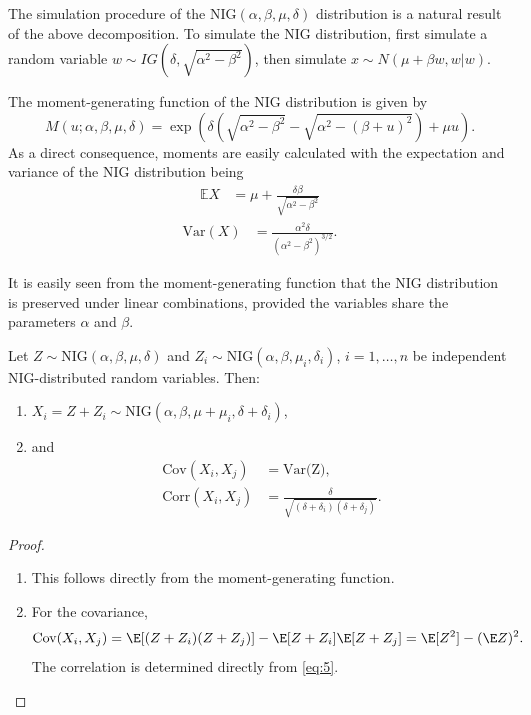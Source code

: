 \documentclass[11pt,a4paper,english]{article}
\begin{document}
The simulation procedure of the NIG$(\alpha, \beta, \mu, \delta)$
distribution is a natural result of the above decomposition.  
To simulate the NIG distribution, first simulate a random variable $w \sim IG(\delta, \sqrt{\alpha^2-\beta^2})$, 
then simulate $x \sim N(\mu+ \beta w, w|w)$. 

The moment-generating function of the NIG distribution is given by
\begin{equation*}
  M(u; \alpha, \beta, \mu, \delta) = \exp\left( \delta
    \left(\sqrt{\alpha^2-\beta^2} - \sqrt{\alpha^2 - (\beta +
        u)^2}\right) + \mu u\right). 
\end{equation*}
As a direct consequence, moments are easily calculated with the
expectation and variance of the NIG distribution being
\begin{align*}
  \mathbb E X &= \mu +
                \frac{\delta \beta}{\sqrt{\alpha^2-\beta^2}}
  \end{align*}
\begin{align} \label{eq:5}
  \text{Var}(X) &= \frac{\alpha^2\delta}{(\alpha^2-\beta^2)^{3/2}}.
\end{align}

It is easily seen from the moment-generating function that the NIG distribution is preserved under linear combinations, provided
the variables share the parameters $\alpha$ and $\beta$. 
\begin{prop}
  \label{prop:NIG}
  Let $Z\sim \text{NIG}(\alpha, \beta, \mu, \delta)$ and
  $Z_i\sim \text{NIG}(\alpha, \beta, \mu_i, \delta_i)$,
  $i=1,\ldots, n$ be independent NIG-distributed random
  variables. Then:
  \begin{enumerate}
  \item  $X_i = Z + Z_i\sim \text{NIG}(\alpha,\beta,\mu+\mu_i,
  \delta+\delta_i)$,
\item and 
  \begin{align}
    \text{Cov}(X_i,X_j) &= \text{Var(Z)},\nonumber\\
    \text{Corr}(X_i,X_j) &= \frac{\delta}{\sqrt{(\delta+\delta_i)
                           (\delta+\delta_j)}}. \label{eq:6}
  \end{align}
\end{enumerate}
\end{prop}
\begin{proof}
  \begin{enumerate}
  \item This follows directly from the moment-generating function. 
  \item For the covariance,
    \begin{equation*}
      \text{Cov}(X_i,X_j)
      = \E[(Z+Z_i) (Z+Z_j)] - \E[Z+Z_i] \E[Z+Z_j]
      = \E[Z^2] -(\E Z)^2.
    \end{equation*}
    The correlation is determined directly from \ref{eq:5}.
  \end{enumerate}
\end{proof}
\end{document}
